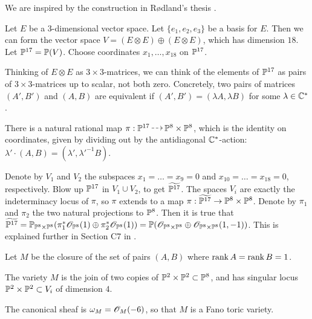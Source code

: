 We are inspired by the construction in Rødland's thesis \cite{rodland_pfaffian}. 

Let $E$ be a 3-dimensional vector space. Let $\{e_1,e_2,e_3\}$ be a basis for $E$. Then we can form the vector space $V= (E \otimes E) \oplus (E \otimes E)$, which has dimension $18$. Let $\P^{17}=\P(V)$. Choose coordinates $x_1,\ldots,x_{18}$ on $\P^{17}$. 

Thinking of $E \otimes E$ as $3 \times 3$-matrices, we can think of the elements of $\P^{17}$ as pairs of $3 \times 3$-matrices up to scalar, not both zero. Concretely, two pairs of matrices $(A',B')$ and $(A,B)$ are equivalent if $(A',B') = (\lambda A, \lambda B)$ for some $\lambda \in \C^\ast$.

There is a natural rational map $\pi:\P^{17} \rmap \P^8 \times \P^8$, which is the identity on coordinates, given by dividing out by the antidiagonal $\C^\ast$-action: $\lambda' \cdot (A,B) = (\lambda',{\lambda'}^{-1} B)$.

Denote by $V_1$ and $V_2$ the subspaces $x_1=\ldots=x_9=0$ and $x_10=\ldots=x_18=0$, respectively. Blow up $\P^{17}$ in $V_1 \cup V_2$, to get $\widetilde{\P^{17}}$. The spaces $V_i$ are exactly the indeterminacy locus of $\pi$, so $\pi$ extends to a map $\pi:\widetilde{\P^{17}} \to \P^8 \times \P^8$. Denote by $\pi_1$ and $\pi_2$ the two natural projections to $\P^8$. Then it is true that $\widetilde{\P^{17}}= \P_{\P^8 \times \P^8}(\pi_1^\ast \OO_{\P^8}(1) \oplus \pi_2^\ast \OO_{\P^8}(1))=\P(\OO_{\P^8\times \P^8} \oplus \OO_{\P^8 \times \P^8}(1,-1))$. This is explained further in Section C7 in \cite{altman_joins}.


Let $M$ be the closure of the set of pairs $(A,B)$ where $\rank A = \rank B = 1$.  

\begin{proposition}
The variety $M$ is the join of two copies of $\P^2 \times \P^2 \subset \P^8$, and has singular locus $\P^2 \times \P^2 \subset V_i$ of dimension $4$.

The canonical sheaf is $\omega_M = \OO_M(-6)$, so that $M$ is a Fano toric variety.
\end{proposition}

